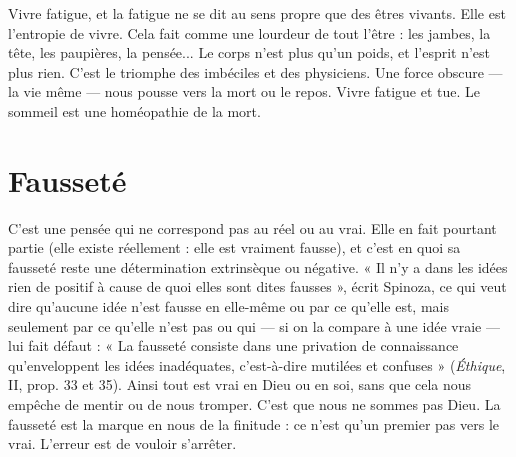 Vivre fatigue, et la fatigue ne se dit au sens propre que des êtres vivants. Elle
est l’entropie de vivre. Cela fait comme une lourdeur de tout l’être : les jambes,
la tête, les paupières, la pensée... Le corps n’est plus qu’un poids, et l'esprit
n’est plus rien. C’est le triomphe des imbéciles et des physiciens. Une force obscure
— la vie même — nous pousse vers la mort ou le repos. Vivre fatigue et tue.
Le sommeil est une homéopathie de la mort.

\section{Fausseté}
C’est une pensée qui ne correspond pas au réel ou au vrai. Elle
en fait pourtant partie (elle existe réellement : elle est vraiment
fausse), et c’est en quoi sa fausseté reste une détermination extrinsèque ou négative.
« Il n’y a dans les idées rien de positif à cause de quoi elles sont dites
fausses », écrit Spinoza, ce qui veut dire qu'aucune idée n’est fausse en elle-même
ou par ce qu’elle est, mais seulement par ce qu’elle n’est pas ou qui — si
on la compare à une idée vraie — lui fait défaut : « La fausseté consiste dans une
privation de connaissance qu’enveloppent les idées inadéquates, c’est-à-dire
mutilées et confuses » ({\it Éthique}, II, prop. 33 et 35). Ainsi tout est vrai en Dieu
ou en soi, sans que cela nous empêche de mentir ou de nous tromper. C’est que
nous ne sommes pas Dieu. La fausseté est la marque en nous de la finitude : ce
n’est qu’un premier pas vers le vrai. L'erreur est de vouloir s’arrêter.


